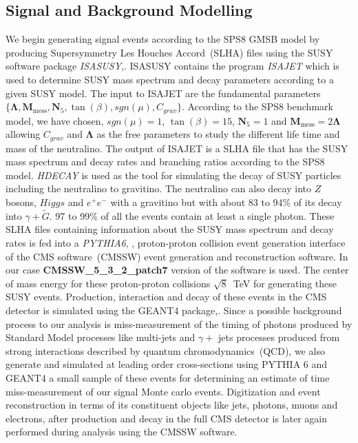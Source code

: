 \subsection{Signal and Background Modelling}
We begin generating signal events according to the SPS8 GMSB model by producing Supersymmetry Les Houches Accord~(SLHA) files using the SUSY software package \textit{ISASUSY},\cite{ISAJET}. ISASUSY contains the  program \textit{ISAJET} which is used to determine SUSY mass spectrum and decay parameters according to a given SUSY model.  The input to ISAJET are the fundamental parameters 
$ \Big\{ \mathbf{\Lambda}, \mathbf{M}_{\mbox{mess}}, \mathbf{N}_{5}, \tan(\beta), sgn(\mu), C_{grav}\Big\} $. According to the SPS8 benchmark model, we have chosen, $sgn(\mu)= 1$, $ \tan(\beta) = 15$, $  \mathbf{N}_{5} = 1 $ and $\mathbf{M}_{\mbox{mess}} = 2\mathbf{\Lambda}$ allowing $ C_{grav}$ and $  \mathbf{\Lambda} $ as the free parameters to study the different life time and mass of the neutralino. The output of ISAJET is a SLHA file that has the SUSY mass spectrum and decay rates and branching ratios according to the SPS8 model. \textit{HDECAY} is used as the tool for simulating the decay of SUSY particles including the neutralino to gravitino. The neutralino can also decay into $Z$ bosons, $Higgs$ and $e^{+}e^{-}$ with a gravitino but with about 83 to 94\% of its decay into $\gamma + \tilde{G}$. 97 to 99\% of all the events contain at least a single photon. 
These SLHA files containing information about the SUSY mass spectrum and decay rates is fed into a \textit{PYTHIA6}, \cite{PYTHIA6}, proton-proton collision event generation interface of the CMS software~(CMSSW) event generation and reconstruction software. In our case \textbf{CMSSW\_5\_3\_2\_patch7} version of the software is used. The center of mass energy for these proton-proton collisions $\sqrt{8}$~TeV for generating these SUSY events. Production, interaction and decay of these events in the CMS detector is simulated using the GEANT4 package,\cite{GEANT4}.
Since a possible background process to our analysis is miss-measurement of the timing of photons produced by Standard Model processes like  multi-jets and $\gamma +$ jets processes produced from strong interactions described by quantum chromodynamics~(QCD), we also  generate and simulated at leading order cross-sections using PYTHIA 6 and GEANT4  a small sample of these events for determining an estimate of time miss-measurement of our signal Monte carlo events.
Digitization and event reconstruction in terms of its constituent objects like jets, photons, muons and electrons, after production and decay in the full CMS detector is later again performed during analysis using the CMSSW software.
